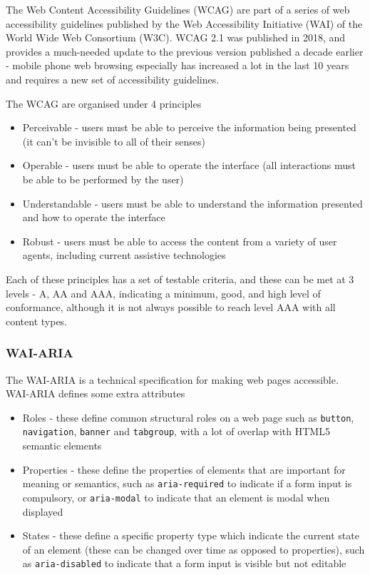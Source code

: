 \documentclass[ %
                    author={Aleena Baig},
                supervisor={Dr Simon Lock},
                    degree={BSc},
                     title={On Making Web Accessible Graphs},
                  subtitle={},
                      year={2019} ]{dissertation}
\begin{document}
The Web Content Accessibility Guidelines (WCAG) are part of a series of web accessibility guidelines published by the Web Accessibility Initiative (WAI) of the World Wide Web Consortium (W3C). WCAG 2.1 was published in 2018, and provides a much-needed update to the previous version published a decade earlier - mobile phone web browsing especially has increased a lot in the last 10 years and requires a new set of accessibility guidelines.

The WCAG are organised under 4 principles

\begin{itemize}
    \item Perceivable - users must be able to perceive the information being presented (it can't be invisible to all of their senses)
    \item Operable - users must be able to operate the interface (all interactions must be able to be performed by the user)
    \item Understandable - users must be able to understand the information presented and how to operate the interface
    \item Robust - users must be able to access the content from a variety of user agents, including current assistive technologies
\end{itemize}

Each of these principles has a set of testable criteria, and these can be met at 3 levels - A, AA and AAA, indicating a minimum, good, and high level of conformance, although it is not always possible to reach level AAA with all content types.

\subsubsection{WAI-ARIA}

The WAI-ARIA is a technical specification for making web pages accessible. WAI-ARIA defines some extra attributes

\begin{itemize}
    \item Roles - these define common structural roles on a web page such as \texttt{button}, \texttt{navigation}, \texttt{banner} and \texttt{tabgroup}, with a lot of overlap with HTML5 semantic elements
    \item Properties - these define the properties of elements that are important for meaning or semantics, such as \texttt{aria-required} to indicate if a form input is compulsory, or \texttt{aria-modal} to indicate that an element is modal when displayed
    \item States - these define a specific property type which indicate the current state of an element (these can be changed over time as opposed to properties), such as \texttt{aria-disabled} to indicate that a form input is visible but not editable
\end{itemize}
\end{document}
